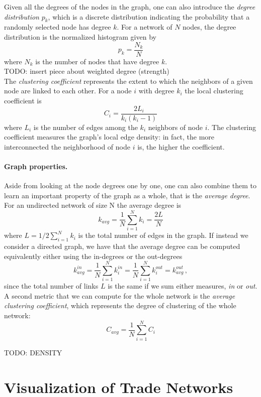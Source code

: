 Given all the degrees of the nodes in the graph, one can also introduce the \textit{degree distribution} $p_k$, which is a discrete distribution indicating the probability that a randomly selected node has degree $k$. For a network of $N$ nodes, the degree distribution is the normalized histogram given by 
\[ p_k = \frac{N_k}{N} \]
where $N_k$ is the number of nodes that have degree $k$. \\

TODO: insert piece about weighted degree (strength) \\

The \textit{clustering coefficient} represents the extent to which the neighbors of a given node are linked to each other. For a node $i$ with degree $k_i$ the local clustering coefficient is
\[
    C_i = \frac{2 L_i}{k_i(k_i-1)}
\]
where $L_i$ is the number of edges among the $k_i$ neighbors of node $i$.
The clustering coefficient measures the graph's local edge density: in fact, the more interconnected the neighborhood of node $i$ is, the higher the coefficient.

\paragraph{Graph properties.}
Aside from looking at the node degrees one by one, one can also combine them to learn an important property of the graph as a whole, that is the \textit{average degree}. For an undirected network of size N the average degree is 
\[ k_{avg} = \frac{1}{N}\sum_{i=1}^N k_i = \frac{2 L }{N} \]
where $L = 1/2 \sum_{i=1}^N k_i$ is the total number of edges in the graph. If instead we consider a directed graph, we have that the average degree can be computed equivalently either using the in-degrees or the out-degrees
\[
    k_{avg}^{in} = \frac{1}{N} \sum_{i=1}^N k_i^{in} = \frac{1}{N} \sum_{i=1}^N k_i^{out} = k_{avg}^{out}\,,
\]
since the total number of links $L$ is the same if we sum either measures, \textit{in} or \textit{out}.
A second metric that we can compute for the whole network is the \textit{average clustering coefficient}, which represents the degree of clustering of the whole network:
\[
    C_{avg} = \frac{1}{N} \sum_{i=1}^N C_i
\]

TODO: DENSITY

\pagebreak
\section{Visualization of Trade Networks}

